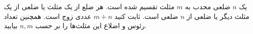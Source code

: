     \p 
یک
$n$
ضلعی محدب به
$m$
مثلث تقسیم شده است. هر ضلع از یک مثلث یا ضلعی از یک مثلث دیگر یا ضلعی از
$n$
ضلعی است. ثابت کنید
$m + n$
عددی زوج است. همچنین تعداد رئوس و اضلاع این مثلث‌ها را بر حسب
$n, m$
بیابید.